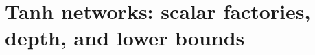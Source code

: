 \section{Tanh networks: scalar factories, depth, and lower bounds}\label{app:tanh}




















